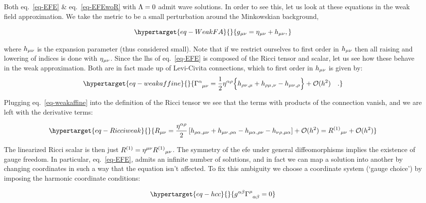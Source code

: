 \documentclass[
  10pt,
  a4paper,
  DIV=11,
  numbers=noendperiod,
  twoside]{scrreprt}
\DeclareRobustCommand{\[}{\begin{equation}}
\DeclareRobustCommand{\]}{\end{equation}}
\begin{document}
Both eq.~\ref{eq-EFE} \& eq.~\ref{eq-EFEwoR} with \(\Lambda=0\) admit
wave solutions. In order to see this, let us look at these equations in
the weak field approximation. We take the metric to be a small
perturbation around the Minkowskian background,

\begin{equation}\protect\hypertarget{eq-WeakFA}{}{
    \met = \mink + \weakmet,
}\label{eq-WeakFA}\end{equation}

where \(h{}_{\mu\nu}\) is the expansion parameter (thus considered small).
Note that if we restrict ourselves to first order in \(h{}_{\mu\nu}\) then
all raising and lowering of indices is done with \(\eta{}_{\mu\nu}\). Since the
\gls{lhs} of eq.~\ref{eq-EFE} is composed of the Ricci tensor and
scalar, let us see how these behave in the weak approximation. Both are
in fact made up of Levi-Civita connections, which to first order in
\(h{}_{\mu\nu}\) is given by:
\begin{equation}\protect\hypertarget{eq-weakaffine}{}{
\LC{\alpha}{\mu}{\nu} = \frac{1}{2} \invmink[\alpha \rho]
\brk[\Big]{
    \ipdv{ \weakmet[\rho \nu]}{\mu}
    +\ipdv{ \weakmet[\rho \mu]}{\nu}
    -\ipdv{ \weakmet}{\rho}} + \order[2]{h}\quad .
}\label{eq-weakaffine}\end{equation}

Plugging eq.~\ref{eq-weakaffine} into the definition of the Ricci tensor
we see that the terms with products of the connection vanish, and we are
left with the derivative terms:

\begin{equation}\protect\hypertarget{eq-Ricciweak}{}{ 
\RicciTco  =
 \frac{\invmink[\alpha\rho]}{2}\left[ \ipdv{\weakmet[\rho\alpha]}{\mu\nu} + \ipdv{\weakmet}{\rho\alpha} - \ipdv{\weakmet[\mu\alpha]}{\rho\nu} - \ipdv{\weakmet[\nu\rho]}{\mu\alpha} \right] + \mathcal{O}(h^2)=\linRicciTco+ \mathcal{O}(h^2)
}\label{eq-Ricciweak}\end{equation}

The linearized Ricci scalar is then just
\(R^{(1)}=\eta{}^{\mu\nu}R^{(1)}{}_{\mu\nu}\). The symmetry of the \gls{efe} under
general diffeomorphisms implies the existence of gauge freedom. In
particular, eq.~\ref{eq-EFE}, admits an infinite number of solutions,
and in fact we can map a solution into another by changing coordinates
in such a way that the equation isn't affected. To fix this ambiguity we
choose a coordinate system (`gauge choice') by imposing the harmonic
coordinate conditions:

\begin{equation}\protect\hypertarget{eq-hcc}{}{ 
   \invmet[\alpha\beta]\LC{\mu}{\alpha}{\beta} =0
}\label{eq-hcc}\end{equation}
\end{document}
